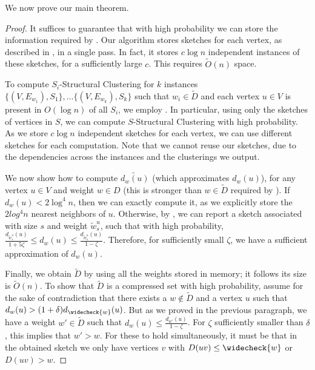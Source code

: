 \documentclass{article}
\newcommand{\set}[1]{\{#1\}}
\begin{document}
We now prove our main theorem.
\lzerofit*
\begin{proof}
It suffices to guarantee that with high probability we can store the information required by .
Our algorithm stores sketches for each vertex, as described in , in a single pass.
In fact, it stores $c \log n$ independent instances of these sketches, for a sufficiently large $c$.
This requires $\widetilde{O}(n)$ space.

To compute $S_i$-Structural Clustering for $k$ instances $\set{(V, E_{w_1}),S_1}, \ldots \set{(V, E_{w_k}), S_k}$ such that $w_i\in \widetilde{D}$ and each vertex $u\in V$ is present in $O(\log{n})$ of all $S_i$, we employ . 
In particular, using only the sketches of vertices in $S$, we can compute $S$-Structural Clustering with high probability.
As we store $c \log n$ independent sketches for each vertex, we can use different sketches for each computation.
Note that we cannot reuse our sketches, due to the dependencies across the instances and the clusterings we output.

We now show how to compute $\widetilde{d_w(u)}$ (which approximates $d_w(u)$), for any vertex $u\in V$ and weight $w\in D$ (this is stronger than $w\in \widetilde{D}$ required by ).
If $d_w(u) < 2\log^4 n$, then we can exactly compute it, as we explicitly store the $2log^4 n$ nearest neighbors of $u$.
Otherwise, by , we can report a sketch 
associated with size $s$ and weight $\tilde{w}^u_s$, such that with high probability, 
$\frac{d_{\tilde{w}^u_{s}}(u)}{1+5\zeta} \leq d_{w}(u) \leq \frac{d_{\tilde{w}^u_s}(u)}{1-\zeta}$.
Therefore, for sufficiently small $\zeta$, we have a sufficient approximation of $d_w(u)$.

Finally, we obtain $\widetilde{D}$ by using all the weights stored in memory; it follows its size is $\widetilde{O}(n)$.
To show that $\widetilde{D}$ is a compressed set with high probability, assume for the sake of contradiction that there exists a $w \not \in \widetilde{D}$ and a vertex $u$ such that $d_w(u) > (1+\delta) d_{\widecheck{w}}(u)$.
But as we proved in the previous paragraph, we have a weight $w'\in \widetilde{D}$ such that $d_{w}(u) \le \frac{d_{w'}(u)}{1-\zeta}$.
For $\zeta$ sufficiently smaller than $\delta$, this implies that $w' > w$.
For these to hold simultaneously, it must be that in the obtained sketch we only have vertices $v$ with $D(uv) \le \widecheck{w}$ or $D(uv)>w$.


\end{proof}
\end{document}
